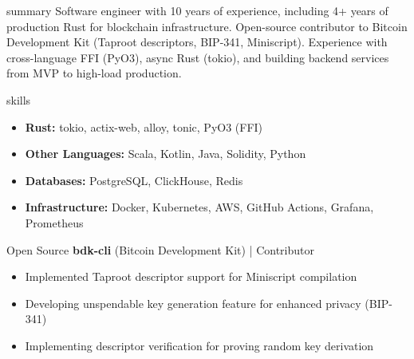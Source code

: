 \documentclass{resume}
\begin{document}
\makeheader
\vspace{0.5cm}

\begin{ResumeSection}{summary}
Software engineer with 10 years of experience, including 4+ years of production Rust for blockchain infrastructure. Open-source contributor to Bitcoin Development Kit (Taproot descriptors, BIP-341, Miniscript). Experience with cross-language FFI (PyO3), async Rust (tokio), and building backend services from MVP to high-load production.
\end{ResumeSection}

\begin{ResumeSection}{skills}
    \begin{itemize}
        \item \textbf{Rust:} tokio, actix-web, alloy, tonic, PyO3 (FFI)
        \item \textbf{Other Languages:} Scala, Kotlin, Java, Solidity, Python
        \item \textbf{Databases:} PostgreSQL, ClickHouse, Redis
        \item \textbf{Infrastructure:} Docker, Kubernetes, AWS, GitHub Actions, Grafana, Prometheus
    \end{itemize}
\end{ResumeSection}

\begin{ResumeSection}{Open Source}
    \textbf{bdk-cli} (Bitcoin Development Kit) | Contributor
    \begin{itemize}
        \item Implemented Taproot descriptor support for Miniscript compilation
        \item Developing unspendable key generation feature for enhanced privacy (BIP-341)
        \item Implementing descriptor verification for proving random key derivation
    \end{itemize}
\end{ResumeSection}
\end{document}
